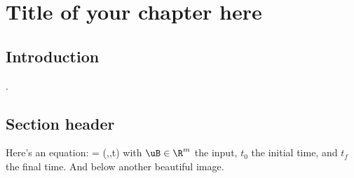 \chapter[Title of your chapter here]{Title of your chapter here}
\label{chap: chapter 3}


\chapterabstract{\lipsum[1]}

\section{Introduction}
\label{sec: chap3 intro}

\lipsum[5-7] \cite{Goebel2012}.


\section{Section header}
\label{sec: chap3 section header}

Here's an equation:
\be
\label{eq: chap3 vector field} \dot{\dxB} = \fB(\xB,\uB,t)
\ee
with $\uB\in\R^m$ the input, $t_0$ the initial time, and $t_f$ the final time.
And below another beautiful image.

\begin{asm}

\end{asm}

